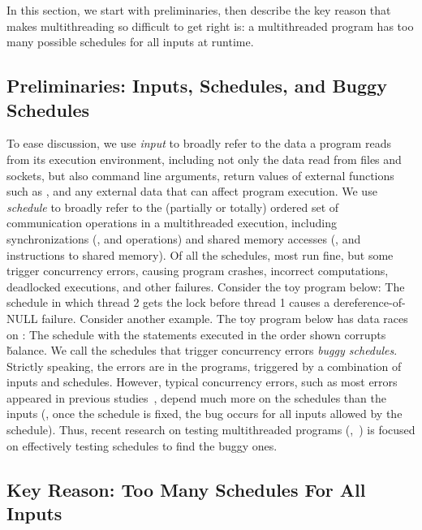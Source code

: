 In this section, we start with preliminaries, then describe the key reason that
makes multithreading so difficult to get right is: a multithreaded program has
too many possible schedules for all inputs at runtime.

\subsection{Preliminaries: Inputs, Schedules, and Buggy Schedules}

To ease discussion, we use \emph{input} to broadly refer to the data a
program reads from its execution environment, including not only the data
read from files and sockets, but also command line arguments, return
values of external functions such as , and any external data
that can affect program execution.  We use \emph{schedule} to broadly refer to
the (partially or totally) ordered set of communication operations in a
multithreaded execution, including synchronizations (\eg,  and
 operations) and shared memory accesses (\eg,  and
 instructions to shared memory). Of all the schedules, most run
fine, but some trigger concurrency errors, causing program crashes,
incorrect computations, deadlocked executions, and other failures.
Consider the toy program below: 
\noindent The schedule in which thread 2 gets the lock before thread 1
causes a dereference-of-NULL failure.  Consider another example.  The toy
program below has data races on : 
\noindent The schedule with the statements executed in the order shown corrupts
\v{balance}. We call the schedules that trigger concurrency errors
\emph{buggy schedules}.  Strictly speaking, the errors are in the
programs, triggered by a combination of inputs and schedules.  However,
typical concurrency errors, such as most errors appeared in previous
studies~\cite{lu:concurrency-bugs,con:hotpar12}, depend much more on the
schedules than the inputs (\eg, once the schedule is fixed, the bug
occurs for all inputs allowed by the schedule).  Thus, recent research on
testing multithreaded programs (\eg,~\cite{musuvathi:chess:osdi08}) is
focused on effectively testing schedules to find the buggy ones.

\subsection{Key Reason: Too Many Schedules For All Inputs}

